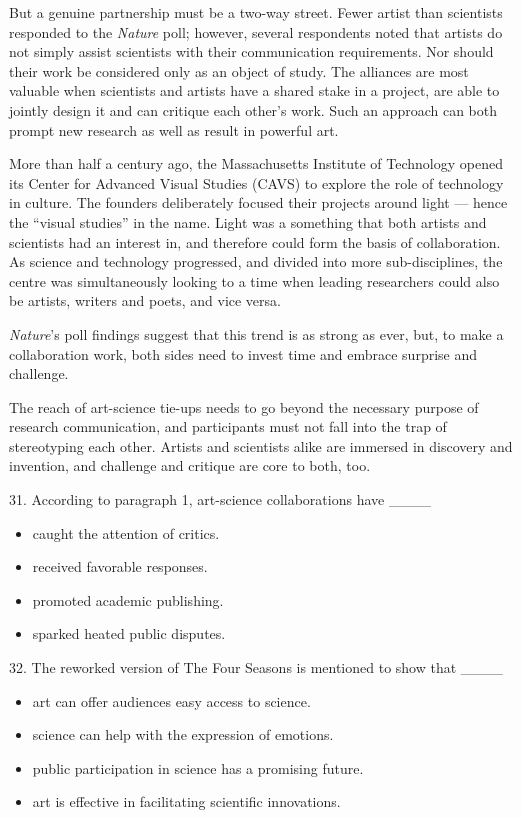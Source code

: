 \documentclass[UTF8,11pt]{ctexart}
\begin{document}
But a genuine partnership must be a two-way street. Fewer artist than scientists responded to the \textit{Nature} poll; however, several respondents noted that artists do not simply assist scientists with their communication requirements. Nor should their work be considered only as an object of study. The alliances are most valuable when scientists and artists have a shared stake in a project, are able to jointly design it and can critique each other’s work. Such an approach can both prompt new research as well as result in powerful art.


More than half a century ago, the Massachusetts Institute of Technology opened its Center for Advanced Visual Studies (CAVS) to explore the role of technology in culture. The founders deliberately focused their projects around light — hence the “visual studies” in the name. Light was a something that both artists and scientists had an interest in, and therefore could form the basis of collaboration. As science and technology progressed, and divided into more sub-disciplines, the centre was simultaneously looking to a time when leading researchers could also be artists, writers and poets, and vice versa.


\textit{Nature}’s poll findings suggest that this trend is as strong as ever, but, to make a collaboration work, both sides need to invest time and embrace surprise and challenge.


The reach of art-science tie-ups needs to go beyond the necessary purpose of research communication, and participants must not fall into the trap of stereotyping each other. Artists and scientists alike are immersed in discovery and invention, and challenge and critique are core to both, too.


31. According to paragraph 1, art-science collaborations have \_\_\_\_


\begin{itemize}[leftmargin=2em,itemsep=.2em,topsep=.4em]\item[A.] caught the attention of critics.
\item[B.] received favorable responses.
\item[C.] promoted academic publishing.
\item[D.] sparked heated public disputes.
\end{itemize}

32. The reworked version of The Four Seasons is mentioned to show that \_\_\_\_


\begin{itemize}[leftmargin=2em,itemsep=.2em,topsep=.4em]\item[A.] art can offer audiences easy access to science.
\item[B.] science can help with the expression of emotions.
\item[C.] public participation in science has a promising future.
\item[D.] art is effective in facilitating scientific innovations.
\end{itemize}
\end{document}
